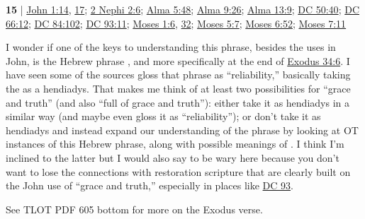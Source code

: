 \begin{compactdesc}
		\item[grace and truth] \textbf{15} | \hyperref[JOHN-1-14]{John 1:14}, \hyperref[JOHN-1-17]{17}; \hyperref[2NEPHI-2-6]{2 Nephi 2:6}; \hyperref[ALMA-5-48]{Alma 5:48}; \hyperref[ALMA-9-26]{Alma 9:26}; \hyperref[ALMA-13-9]{Alma 13:9}; \hyperref[DC50-40]{DC 50:40}; \hyperref[DC66-12]{DC 66:12}; \hyperref[DC84-102]{DC 84:102}; \hyperref[DC93-11]{DC 93:11}; \hyperref[MOSES-1-6]{Moses 1:6}, \hyperref[MOSES-1-32]{32}; \hyperref[MOSES-5-7]{Moses 5:7}; \hyperref[MOSES-6-52]{Moses 6:52}; \hyperref[MOSES-7-11]{Moses 7:11}
			\begin{compactdesc}
				\item[Bible anchor verses] \phantom{.}
					\begin{compactdesc}
						\item[John 1:14]
						\item[John 1:17]
					\end{compactdesc}
				\item[Commentary] I wonder if one of the keys to understanding this phrase, besides the uses in John, is the Hebrew phrase , and more specifically  at the end of \hyperref[EXODUS-34-6]{Exodus 34:6}. I have seen some of the sources gloss that phrase as ``reliability,'' basically taking the  as a hendiadys. That makes me think of at least two possibilities for ``grace and truth'' (and also ``full of grace and truth''): either take it as hendiadys in a similar way (and maybe even gloss it as ``reliability''); or don't take it as hendiadys and instead expand our understanding of the phrase by looking at OT instances of this Hebrew phrase, along with possible meanings of . I think I'm inclined to the latter but I would also say to be wary here because you don't want to lose the connections with restoration scripture that are clearly built on the John use of ``grace and truth,'' especially in places like \hyperref[DC93]{DC 93}.
					\begin{compactitem}
						\item See TLOT PDF 605 bottom for more on the Exodus verse.
					\end{compactitem}
			\end{compactdesc}
			

\end{compactdesc}
